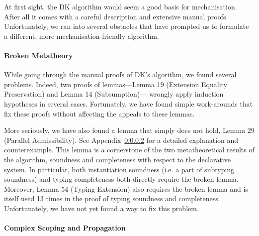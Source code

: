 At first sight, the DK algorithm would seem a good basis for mechanisation. After
all it comes with a careful description and extensive manual proofs.
Unfortunately, we ran into several obstacles that have prompted us to formulate
a different, more mechanisation-friendly algorithm.

\paragraph{Broken Metatheory} %
While going through the manual proofs of DK's algorithm, we found several
problems.  Indeed, two proofs of lemmas---Lemma 19 (Extension Equality
Preservation) and Lemma 14 (Subsumption)--- wrongly apply induction hypotheses
in several cases. Fortunately, we have found simple work-arounds that fix these
proofs without affecting the appeals to these lemmas.


More seriously, we have also found a lemma that simply does not hold, 
Lemma 29 (Parallel Admissibility). See Appendix~\ref{} for a detailed explanation
and counterexample. This lemma is a cornerstone of the two metatheoretical results 
of the algorithm, soundness and completeness with respect to the declarative system.
In particular, both instantiation soundness (i.e. a part of subtyping
soundness) and typing completeness both directly require the broken lemma.
Moreover, Lemma 54 (Typing Extension) also requires the broken lemma and is
itself used 13 times in the proof of typing soundness and completeness.
Unfortunately, we have not yet found a way to fix this problem.

\paragraph{Complex Scoping and Propagation}

